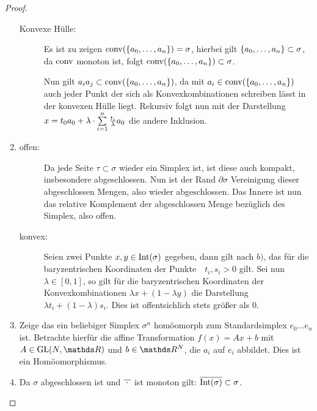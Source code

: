 \begin{Satz}
\begin{proof}
\begin{enumerate}[$a)$:]
\begin{description}
      \item[Konvexe Hülle:] Es ist zu zeigen
        $\conv(\sset{a_0,\ldots , a_n}) = \sigma$, hierbei gilt
        $\sset{a_0,\ldots,a_n} \subset \sigma$, da $\conv$ monoton
        ist, folgt $\conv(\sset{a_0,\ldots , a_n}) \subset \sigma$.
        
        Nun gilt $a_ia_j \subset \conv( \sset{a_0,\ldots , a_n} )$, da
        mit $a_i \in \ch$ auch jeder Punkt der sich als
        Konvexkombinationen schreiben lässt in der konvexen Hülle
        liegt. Rekursiv folgt nun mit der Darstellung
        $x = t_0 a_0 + \lambda \cdot \sp{1}{n} \frac{t_i}{\lambda}
        a_0$ die andere Inklusion.
     \end{description}

   \item \begin{description}
     \item[offen:] Da jede Seite $\tau \subset \sigma$ wieder ein
       Simplex ist, ist diese auch kompakt, insbesondere
       abgeschlossen. Nun ist der Rand $\partial\sigma$ Vereinigung
       dieser abgeschlossen Mengen, also wieder abgeschlossen. Das
       Innere ist nun das relative Komplement der abgeschlossen Menge
       bezüglich des Simplex, also offen.
     \item[konvex:] Seien zwei Punkte $x,y \in \Int(\sigma)$ gegeben,
       dann gilt nach $b)$, das für die baryzentrischen Koordinaten
       der Punkte~~$t_i,s_i >0$ gilt. Sei nun $\lambda \in [0,1]$, so
       gilt für die baryzentrischen Koordinaten der
       Konvexkombinationen $\lambda x + (1-\lambda y)$ die Darstellung
       $\lambda t_i + (1-\lambda)s_i$. Dies ist offentsichlich stets
       größer als $0$.
        \end{description}
      \item Zeige das ein beliebiger Simplex $\sigma^n$ homöomorph zum
        Standardsimplex $e_0\ldots e_n$ ist. Betrachte hierfür die
        affine Transformation $f(x) = Ax+b$ mit $A \in \GL(N,\R)$ und
        $b \in \R^N$, die $a_i$ auf $e_i$ abbildet. Dies ist ein
        Homöomorphismus.
      \item Da $\sigma$ abgeschlossen ist und
        $\overline{\hspace{0.1cm} \cdot \hspace{0.1cm}}$ ist monoton
        gilt: $\overline{\Int(\sigma)} \subset \sigma$.


\end{enumerate}
\end{proof}
\end{Satz}
